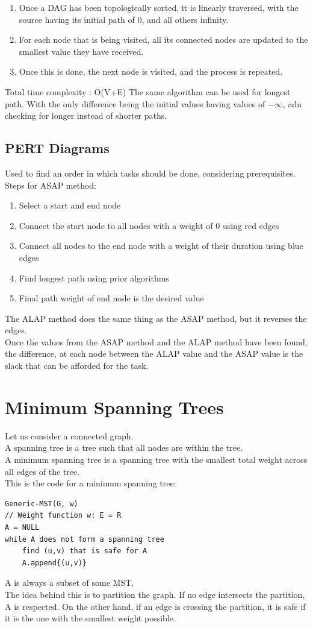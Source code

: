 \documentclass[nobib]{tufte-handout}
\begin{document}
\begin{enumerate}
    \item Once a DAG has been topologically sorted, it is linearly traversed, with the source having its initial path of 0, and all others infinity.
    \item For each node that is being visited, all its connected nodes are updated to the smallest value they have received.
    \item Once this is done, the next node is visited, and the process is repeated.
\end{enumerate}
Total time complexity : O(V+E)
The same algorithm can be used for longest path. With the only difference being the initial values having values of $-\infty$, adn checking for longer instead of shorter paths.\\
\subsection{PERT Diagrams}
Used to find an order in which tasks should be done, considering prerequisites.\\
Steps for ASAP method:
\begin{enumerate}
    \item Select a start and end node
    \item Connect the start node to all nodes with a weight of 0 using red edges
    \item Connect all nodes to the end node with a weight of their duration using blue edges
    \item Find longest path using prior algorithms
    \item Final path weight of end node is the desired value
\end{enumerate}
The ALAP method does the same thing as the ASAP method, but it reverses the edges.\\
Once the values from the ASAP method and the ALAP method have been found, the difference, at each node between the ALAP value and the ASAP value is the slack that can be afforded for the task.\\
\section{Minimum Spanning Trees}
Let us consider a connected graph.\\ 
A spanning tree is a tree such that all nodes are within the tree.\\
A minimum spanning tree is a spanning tree with the smallest total weight across all edges of the tree.\\
This is the code for a minimum spanning tree:
\begin{lstlisting}
Generic-MST(G, w)
// Weight function w: E = R
A = NULL
while A does not form a spanning tree
    find (u,v) that is safe for A
    A.append{(u,v)}
\end{lstlisting}
A is always a subset of some MST.\\
The idea behind this is to partition the graph. If no edge intersects the partition, A is respected. On the other hand, if an edge is crossing the partition, it is safe if it is the one with the smallest weight possible.\\
\end{document}
